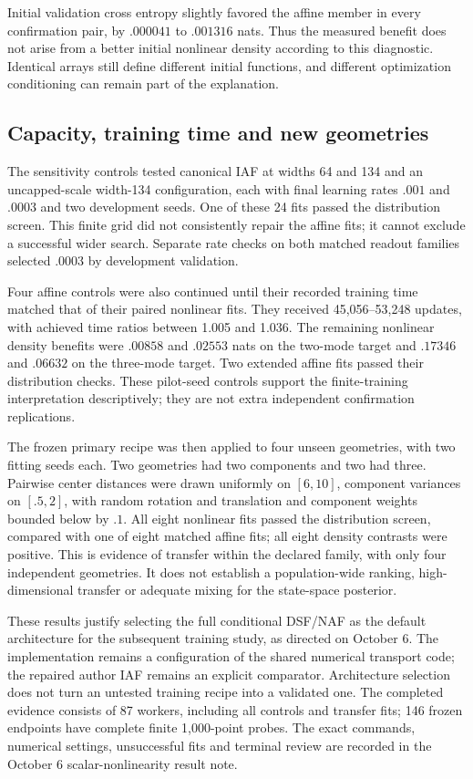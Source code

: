 Initial validation cross entropy slightly favored the affine member in every
confirmation pair, by $.000041$ to $.001316$ nats. Thus the measured benefit
does not arise from a better initial nonlinear density according to this
diagnostic. Identical arrays still define different initial functions, and
different optimization conditioning can remain part of the explanation.

\subsection{Capacity, training time and new geometries}

The sensitivity controls tested canonical IAF at widths 64 and 134 and an
uncapped-scale width-134 configuration, each with final learning rates $.001$
and $.0003$ and two development seeds. One of these 24 fits passed the
distribution screen. This finite grid did not consistently repair the affine
fits; it cannot exclude a successful wider search. Separate rate checks on
both matched readout families selected $.0003$ by development validation.

Four affine controls were also continued until their recorded training time
matched that of their paired nonlinear fits. They received 45,056--53,248
updates, with achieved time ratios between 1.005 and 1.036. The remaining
nonlinear density benefits were $.00858$ and $.02553$ nats on the two-mode
target and $.17346$ and $.06632$ on the three-mode target. Two extended affine
fits passed their distribution checks. These pilot-seed controls support the
finite-training interpretation descriptively; they are not extra independent
confirmation replications.

The frozen primary recipe was then applied to four unseen geometries, with
two fitting seeds each. Two geometries had two components and two had three.
Pairwise center distances were drawn uniformly on $[6,10]$, component variances
on $[.5,2]$, with random rotation and translation and component weights bounded
below by $.1$. All eight nonlinear fits passed the distribution screen,
compared with one of eight matched affine fits; all eight density contrasts
were positive. This is evidence of transfer within the declared family, with
only four independent geometries. It does not establish a population-wide
ranking, high-dimensional transfer or adequate mixing for the state-space
posterior.

These results justify selecting the full conditional DSF/NAF as the default
architecture for the subsequent training study, as directed on October 6.
The implementation remains a configuration of the shared numerical transport
code; the repaired author IAF remains an explicit comparator. Architecture
selection does not turn an untested training recipe into a validated one.
The completed evidence consists of 87 workers, including all controls and
transfer fits; 146 frozen endpoints have complete finite 1,000-point probes.
The exact commands, numerical settings, unsuccessful fits and terminal review
are recorded in the October 6 scalar-nonlinearity result note.

